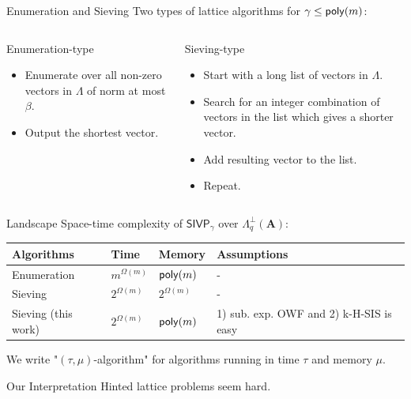 \documentclass[xcolor=table,10pt,aspectratio=169]{beamer}
\renewcommand{\vec}[1]{\ensuremath{\mathbf{#1}}\xspace}
\providecommand{\mat}[1]{\ensuremath{\vec{#1}}\xspace}
\newcommand{\SIVP}{\ensuremath{\mathsf{SIVP}}\xspace}
\begin{document}
\begin{frame}[label={sec:org6ffc295}]{Enumeration and Sieving}
Two types of lattice algorithms for \(\gamma \leq \poly[m]\):

\begin{columns}[t]
\begin{column}{0.45\columnwidth}
\begin{alertblock}{Enumeration-type}
\begin{itemize}
\item Enumerate over all non-zero vectors in \(\Lambda\) of norm at most \(\beta\).
\item Output the shortest vector.
\end{itemize}
\end{alertblock}
\end{column}

\begin{column}{0.45\columnwidth}
\begin{alertblock}{Sieving-type}
\begin{itemize}
\item Start with a long list of vectors in \(\Lambda\).
\item Search for an integer combination of vectors in the list which gives a shorter vector.
\item Add resulting vector to the list.
\item Repeat.
\end{itemize}
\end{alertblock}
\end{column}
\end{columns}
\end{frame}

\begin{frame}[label={sec:org4c56905}]{Landscape}
Space-time complexity of \(\SIVP_\gamma\) over \(\Lambda_q^\bot(\mat{A})\):

\begin{center}
\begin{tabular}{llll}
\toprule
Algorithms & Time & Memory & Assumptions\\[0pt]
\midrule
Enumeration & \(m^{\Omega(m)}\) & \(\poly[m]\) & -\\[0pt]
Sieving & \(2^{\Omega(m)}\) & \(2^{\Omega(m)}\) & -\\[0pt]
Sieving (this work) & \(2^{\Omega(m)}\) & \(\poly[m]\) & 1) sub. exp. OWF and 2) k-H-SIS is easy\\[0pt]
\bottomrule
\end{tabular}

\end{center}

We write "\((\tau,\mu)\)-algorithm" for algorithms running in time \(\tau\) and memory \(\mu\).

\begin{alertblock}{Our Interpretation}
Hinted lattice problems seem hard.
\end{alertblock}
\end{frame}
\end{document}
